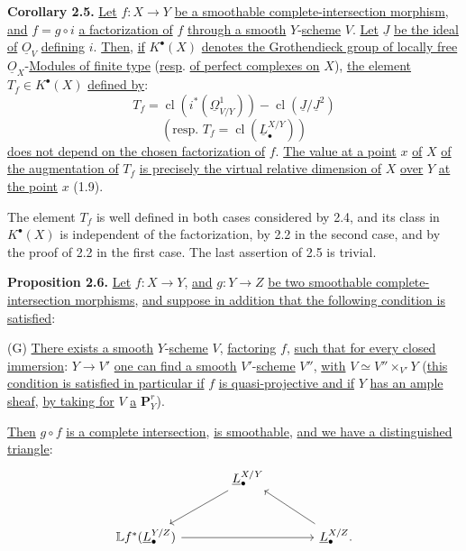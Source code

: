 \textbf{Corollary 2.5.} \uline{Let} $f:X\to Y$ \uline{be a smoothable complete-intersection morphism}, \uline{and} $f=g\circ i$ \uline{a factorization of} $f$ \uline{through a smooth} $Y$-\uline{scheme} $V$. \uline{Let} $\underline{J}$ \uline{be the ideal of} $\underline{O}_V$ \uline{defining} $i$. \uline{Then}, \uline{if} $K^{\bullet}(X)$ \uline{denotes the Grothendieck group of locally free} $\underline{O}_X$-\uline{Modules of finite type} (\uline{resp}. \uline{of perfect complexes on} $X$), \uline{the element} $T_f\in K^{\bullet}(X)$ \uline{defined by}:
\[
T_f=\operatorname{cl}(i^*(\underline{\Omega}^1_{V/Y}))-\operatorname{cl}(\underline{J}/\underline{J}^2)
\]
\[
(\text{resp. }T_f=\operatorname{cl}(\underline{L}^{X/Y}_\bullet))
\]
\uline{does not depend on the chosen factorization of} $f$. \uline{The value at a point} $x$ \uline{of} $X$ \uline{of the augmentation of} $T_f$ \uline{is precisely the virtual relative dimension of} $X$ \uline{over} $Y$ \uline{at the point} $x$ (1.9).

The element $T_f$ is well defined in both cases considered by 2.4, and its class in $K^{\bullet}(X)$ is independent of the factorization, by 2.2 in the second case, and by the proof of 2.2 in the first case. The last assertion of 2.5 is trivial.

\textbf{Proposition 2.6.} \uline{Let} $f:X\to Y$, \uline{and} $g:Y\to Z$ \uline{be two smoothable complete-intersection morphisms}, \uline{and suppose in addition that the following condition is satisfied}:

%
(G) \uline{There
exists a smooth} $Y$-\uline{scheme} $V$, \uline{factoring} $f$, \uline{such that for every closed immersion}: $Y\to V'$ \uline{one can find a smooth} $V'$-\uline{scheme} $V''$, \uline{with} $V\simeq V''\times_{V'}Y$ (\uline{this condition is satisfied in particular if} $f$ \uline{is quasi-projective and if} $Y$ \uline{has an ample sheaf}, \uline{by taking for} $V$ \uline{a} $\mathbf{P}^r_Y$).

\uline{Then} $g\circ f$ \uline{is a complete intersection}, \uline{is smoothable}, \uline{and we have a distinguished triangle}:
\[
\begin{tikzcd}[column sep=large,row sep=large]
& \underline{L}^{X/Y}_\bullet \arrow[dl] \\
\mathbb Lf^*(\underline{L}^{Y/Z}_\bullet) \arrow[rr] && \underline{L}^{X/Z}_\bullet . \arrow[ul]
\end{tikzcd}
\]

